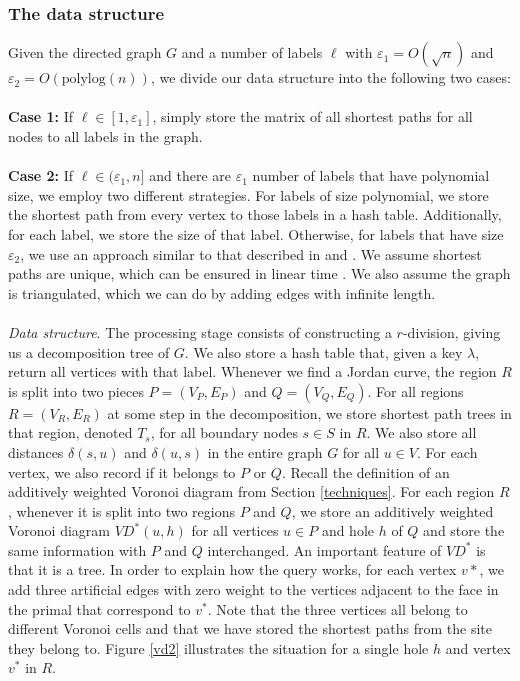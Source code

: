 \subsubsection{The data structure}
Given the directed graph $G$ and a number of labels $\ell$ with
$\varepsilon_1 = O(\sqrt{n})$ and $\varepsilon_2=O(\text{polylog}(n))$, we divide our
data structure into the following two cases: \\
\\
\textbf{Case 1:} If $\ell\in [1, \varepsilon_1]$, simply store the matrix of all shortest paths for all nodes to all
labels in the graph. \\
\\
\textbf{Case 2:} If $\ell\in (\varepsilon_1, n]$ and there are $\varepsilon_1$ number of labels that have
polynomial size, we employ two different strategies. For labels of size polynomial, we store the
shortest path from every vertex to those labels in a hash table. Additionally, for each
label, we store the size of that label. Otherwise, for labels that have size
$\varepsilon_2$, we
use an approach similar to that described in \cite{cohen2017fast} and
\cite{gawrychowski2017better}. We assume shortest paths are unique, which can be ensured
in linear time \cite{motwani2010randomized}\cite{mulmuley1987matching}. We also assume
the graph is triangulated, which we can do by adding edges with infinite length.\\
\\
\indent
\textit{Data structure}. The processing stage consists of constructing a $r$-division,
giving us a decomposition tree of $G$. We also store a hash table that, given a key
$\lambda$, return all vertices with that label. Whenever we find a Jordan curve, the region $R$ is
split into two pieces $P=(V_P, E_P)$ and
$Q=(V_Q, E_Q)$. For all regions $R=(V_R, E_R)$ at some
step in the decomposition, we store shortest path trees in that region, denoted $T_s$,
for all boundary nodes $s\in S$ in $R$. We also store all distances $\delta(s,u)$ and
$\delta(u,s)$ in the entire graph $G$ for all $u\in V$. For each vertex, we also record
if it belongs to $P$ or $Q$. Recall the definition of an
additively weighted Voronoi diagram from Section \ref{techniques}. For each region $R$,
whenever it is split into two regions $P$ and $Q$, we store an additively weighted
Voronoi diagram $VD^*(u,h)$ for all vertices $u\in P$ and hole $h$ of $Q$ and store the
same information with $P$ and $Q$ interchanged. An important feature of $VD^*$ is that it is a tree. In order to explain how the
query works, for each vertex $v*$, we add three artificial edges with zero weight to the vertices adjacent
to the face in the primal that correspond to $v^*$. Note that the three vertices all
belong to different Voronoi cells and that we have stored the shortest paths from the site they
belong to. Figure \ref{vd2} illustrates the
situation for a single hole $h$ and vertex $v^*$ in $R$.

